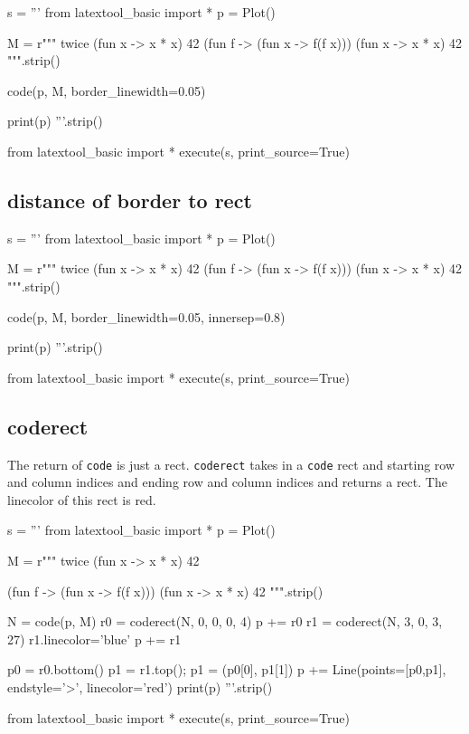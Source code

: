\begin{python}
s = '''
from latextool_basic import *
p = Plot()

M = r"""
twice (fun x -> x * x) 42
(fun f -> (fun x -> f(f x))) (fun x -> x * x) 42
""".strip()
    
code(p, M, border_linewidth=0.05)

print(p)
'''.strip()

from latextool_basic import *
execute(s, print_source=True)
\end{python}




\newpage
\subsection{distance of border to rect}

\begin{python}
s = '''
from latextool_basic import *
p = Plot()

M = r"""
twice (fun x -> x * x) 42
(fun f -> (fun x -> f(f x))) (fun x -> x * x) 42
""".strip()
    
code(p, M, border_linewidth=0.05, innersep=0.8)

print(p)
'''.strip()

from latextool_basic import *
execute(s, print_source=True)
\end{python}




\newpage
\subsection{coderect}

The return of \verb!code! is just a rect.
\verb!coderect! takes in a \verb!code! rect and
starting row and column indices and
ending row and column indices and returns a rect.
The linecolor of this rect is red.

\begin{python}
s = '''
from latextool_basic import *
p = Plot()

M = r"""
twice (fun x -> x * x) 42


(fun f -> (fun x -> f(f x))) (fun x -> x * x) 42
""".strip()
    
N = code(p, M)
r0 = coderect(N, 0, 0, 0, 4)
p += r0
r1 = coderect(N, 3, 0, 3, 27)
r1.linecolor='blue'
p += r1

p0 = r0.bottom()
p1 = r1.top(); p1 = (p0[0], p1[1])
p += Line(points=[p0,p1], endstyle='>', linecolor='red')
print(p)
'''.strip()

from latextool_basic import *
execute(s, print_source=True)
\end{python}




